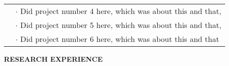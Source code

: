 \documentclass[11pt,english]{article}
\begin{document}
\begin{minipage}{\textwidth}
\begin{tabular}{ @{} p{32mm} p{135mm} @{} }
        & $\cdot$ \small Did project number 4 here, which was about this and that, \\
      
        & $\cdot$ \small Did project number 5 here, which was about this and that, \\
      
        & $\cdot$ \small Did project number 6 here, which was about this and that \\
      \end{tabular}
    \vspace{2mm}
  
  \vspace{20mm}


\end{minipage}%
%
%
%
%
%
%
%

\medskip

\selectfont

\hspace{-20mm}\colorbox{maincolor}{\begin{minipage}[t][8mm][c]{75mm}
\hspace{20mm}\bfseries \color{white}  RESEARCH EXPERIENCE
\end{minipage}}
\vspace{6mm}
\end{document}
